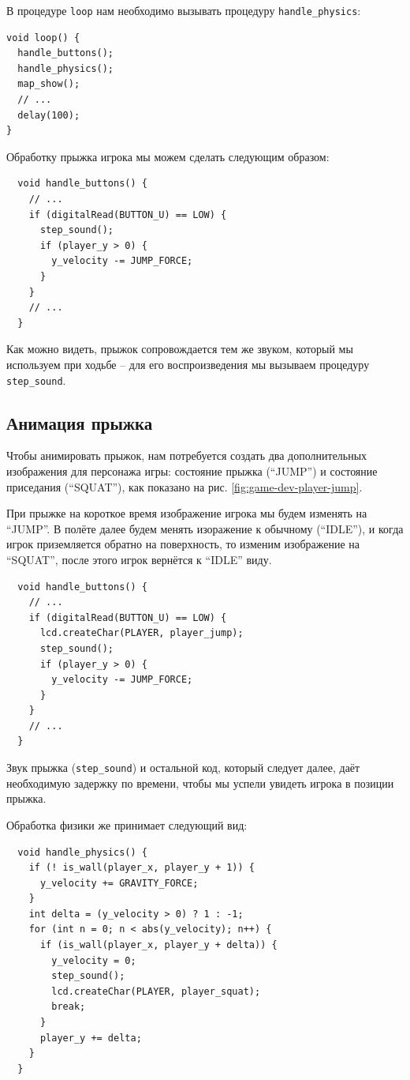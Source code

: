 \documentclass[../sparc.tex]{subfiles}
\begin{document}
В процедуре \texttt{loop} нам необходимо вызывать процедуру
\texttt{handle_physics}:

\begin{verbatim}
void loop() {
  handle_buttons();
  handle_physics();
  map_show();
  // ...
  delay(100);
}
\end{verbatim}

Обработку прыжка игрока мы можем сделать следующим образом:

\begin{verbatim}
  void handle_buttons() {
    // ...
    if (digitalRead(BUTTON_U) == LOW) {
      step_sound();
      if (player_y > 0) {
        y_velocity -= JUMP_FORCE;
      }
    }
    // ...
  }
\end{verbatim}

Как можно видеть, прыжок сопровождается тем же звуком, который мы используем при
ходьбе -- для его воспроизведения мы вызываем процедуру
\texttt{step_sound}.

\subsection{Анимация прыжка}


Чтобы анимировать прыжок, нам потребуется создать два дополнительных изображения
для персонажа игры: состояние прыжка (``JUMP'') и состояние приседания
(``SQUAT''), как показано на рис. \ref{fig:game-dev-player-jump}.

При прыжке на короткое время изображение игрока мы будем изменять на ``JUMP''.
В полёте далее будем менять изоражение к обычному (``IDLE''), и когда игрок
приземляется обратно на поверхность, то изменим изображение на ``SQUAT'', после
этого игрок вернётся к ``IDLE'' виду.

\begin{verbatim}
  void handle_buttons() {
    // ...
    if (digitalRead(BUTTON_U) == LOW) {
      lcd.createChar(PLAYER, player_jump);
      step_sound();
      if (player_y > 0) {
        y_velocity -= JUMP_FORCE;
      }
    }
    // ...
  }
\end{verbatim}

Звук прыжка (\texttt{step_sound}) и остальной код, который следует
далее, даёт необходимую задержку по времени, чтобы мы успели увидеть игрока в
позиции прыжка.

Обработка физики же принимает следующий вид:

\begin{verbatim}
  void handle_physics() {
    if (! is_wall(player_x, player_y + 1)) {
      y_velocity += GRAVITY_FORCE;
    }
    int delta = (y_velocity > 0) ? 1 : -1;
    for (int n = 0; n < abs(y_velocity); n++) {
      if (is_wall(player_x, player_y + delta)) {
        y_velocity = 0;
        step_sound();
        lcd.createChar(PLAYER, player_squat);
        break;
      }
      player_y += delta;
    }
  }
\end{verbatim}
\end{document}
